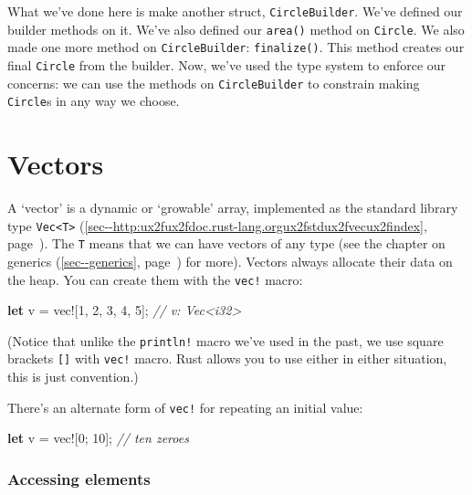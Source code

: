 \documentclass[a4paper,]{book}
\renewcommand*{\hyperref}[2][\ar]{%
  \def\ar{#2}%
  #2 (\autoref{#1}, page~\pageref{#1})}
\newenvironment{Shaded}{\begin{snugshade}}{\end{snugshade}}
\newcommand{\KeywordTok}[1]{\textcolor[rgb]{0.13,0.29,0.53}{\textbf{{#1}}}}
\newcommand{\DecValTok}[1]{\textcolor[rgb]{0.00,0.00,0.81}{{#1}}}
\newcommand{\CommentTok}[1]{\textcolor[rgb]{0.56,0.35,0.01}{\textit{{#1}}}}
\newcommand{\OtherTok}[1]{\textcolor[rgb]{0.56,0.35,0.01}{{#1}}}
\newcommand{\NormalTok}[1]{{#1}}
\begin{document}
What we've done here is make another struct, \texttt{CircleBuilder}.
We've defined our builder methods on it. We've also defined our
\texttt{area()} method on \texttt{Circle}. We also made one more method
on \texttt{CircleBuilder}: \texttt{finalize()}. This method creates our
final \texttt{Circle} from the builder. Now, we've used the type system
to enforce our concerns: we can use the methods on
\texttt{CircleBuilder} to constrain making \texttt{Circle}s in any way
we choose.

\section{Vectors}\label{sec--vectors}

A `vector' is a dynamic or `growable' array, implemented as the standard
library type
\hyperref[sec--http:ux2fux2fdoc.rust-lang.orgux2fstdux2fvecux2findex]{\texttt{Vec\textless{}T\textgreater{}}}.
The \texttt{T} means that we can have vectors of any type (see the
chapter on \hyperref[sec--generics]{generics} for more). Vectors always
allocate their data on the heap. You can create them with the
\texttt{vec!} macro:

\begin{Shaded}
\begin{Highlighting}[]
\KeywordTok{let} \NormalTok{v = }\OtherTok{vec!}\NormalTok{[}\DecValTok{1}\NormalTok{, }\DecValTok{2}\NormalTok{, }\DecValTok{3}\NormalTok{, }\DecValTok{4}\NormalTok{, }\DecValTok{5}\NormalTok{]; }\CommentTok{// v: Vec<i32>}
\end{Highlighting}
\end{Shaded}

(Notice that unlike the \texttt{println!} macro we've used in the past,
we use square brackets \texttt{{[}{]}} with \texttt{vec!} macro. Rust
allows you to use either in either situation, this is just convention.)

There's an alternate form of \texttt{vec!} for repeating an initial
value:

\begin{Shaded}
\begin{Highlighting}[]
\KeywordTok{let} \NormalTok{v = }\OtherTok{vec!}\NormalTok{[}\DecValTok{0}\NormalTok{; }\DecValTok{10}\NormalTok{]; }\CommentTok{// ten zeroes}
\end{Highlighting}
\end{Shaded}

\subsubsection{Accessing elements}\label{accessing-elements}
\end{document}

